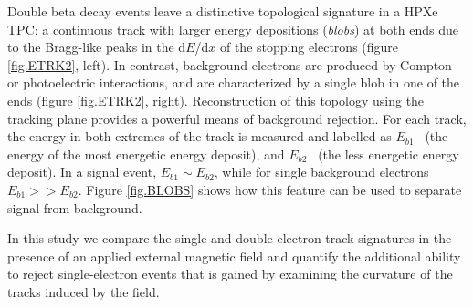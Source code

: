 \documentclass{JINST}
\begin{document}
Double beta decay events leave a distinctive topological signature in a HPXe TPC: a continuous track with larger energy depositions (\emph{blobs}) at both ends due to the Bragg-like peaks in the d$E$/d$x$ of the stopping electrons (figure \ref{fig.ETRK2}, left). In contrast, background electrons are produced by Compton or photoelectric interactions, and are characterized by a single blob in one of the ends (figure \ref{fig.ETRK2}, right). Reconstruction of this topology using the tracking plane provides a powerful means of background rejection. For each track, the energy in both extremes of the track is measured and labelled as $E_{b1}$~ (the energy of the most energetic energy deposit), and $E_{b2}$~ (the less energetic energy deposit). In a signal event, $E_{b1} \sim E_{b2} $, while for single background electrons $E_{b1} >> E_{b2} $. Figure \ref{fig.BLOBS} shows how this feature can be used to separate signal from background. 

In this study we compare the single and double-electron track signatures in the presence of an applied external magnetic field and quantify the additional ability to reject single-electron events that is gained by examining the curvature of the tracks induced by the field.
\end{document}
